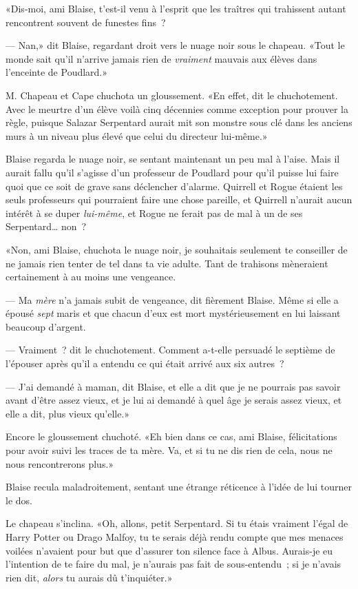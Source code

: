 «Dis-moi, ami Blaise, t'est-il venu à l'esprit que les traîtres qui trahissent autant rencontrent souvent de funestes fins~?

--- Nan,» dit Blaise, regardant droit vers le nuage noir sous le chapeau. «Tout le monde sait qu'il n'arrive jamais rien de \emph{vraiment} mauvais aux élèves dans l'enceinte de Poudlard.»

M. Chapeau et Cape chuchota un gloussement. «En effet, dit le chuchotement. Avec le meurtre d'un élève voilà cinq décennies comme exception pour prouver la règle, puisque Salazar Serpentard aurait mit son monstre sous clé dans les anciens murs à un niveau plus élevé que celui du directeur lui-même.»

Blaise regarda le nuage noir, se sentant maintenant un peu mal à l'aise. Mais il aurait fallu qu'il s'agisse d'un professeur de Poudlard pour qu'il puisse lui faire quoi que ce soit de grave sans déclencher d'alarme. Quirrell et Rogue étaient les seuls professeurs qui pourraient faire une chose pareille, et Quirrell n'aurait aucun intérêt à se duper \emph{lui-même}, et Rogue ne ferait pas de mal à un de ses Serpentard… non~?

«Non, ami Blaise, chuchota le nuage noir, je souhaitais seulement te conseiller de ne jamais rien tenter de tel dans ta vie adulte. Tant de trahisons mèneraient certainement à au moins une vengeance.

--- Ma \emph{mère} n'a jamais subit de vengeance, dit fièrement Blaise. Même si elle a épousé \emph{sept} maris et que chacun d'eux est mort mystérieusement en lui laissant beaucoup d'argent.

--- Vraiment~? dit le chuchotement. Comment a-t-elle persuadé le septième de l'épouser après qu'il a entendu ce qui était arrivé aux six autres~?

--- J'ai demandé à maman, dit Blaise, et elle a dit que je ne pourrais pas savoir avant d'être assez vieux, et je lui ai demandé à quel âge je serais assez vieux, et elle a dit, plus vieux qu'elle.»

Encore le gloussement chuchoté. «Eh bien dans ce cas, ami Blaise, félicitations pour avoir suivi les traces de ta mère. Va, et si tu ne dis rien de cela, nous ne nous rencontrerons plus.»

Blaise recula maladroitement, sentant une étrange réticence à l'idée de lui tourner le dos.

Le chapeau s'inclina. «Oh, allons, petit Serpentard. Si tu étais vraiment l'égal de Harry Potter ou Drago Malfoy, tu te serais déjà rendu compte que mes menaces voilées n'avaient pour but que d'assurer ton silence face à Albus. Aurais-je eu l'intention de te faire du mal, je n'aurais pas fait de sous-entendu~; si je n'avais rien dit, \emph{alors} tu aurais dû t'inquiéter.»

